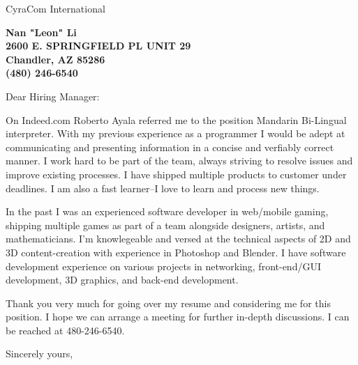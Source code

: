 \documentclass[10pt]{letter} %
\newcommand{\companyname}{CyraCom International}
\begin{document}
\signature{Nan "Leon" Li}                  %
\longindentation=5pt                       %
\let\raggedleft\raggedright                %
 
\begin{letter}{\companyname} 

\begin{center}
\large\bf Nan "Leon" Li \\
2600 E. SPRINGFIELD PL UNIT 29 \\ Chandler, AZ 85286 \\ (480) 246-6540%
\end{center} 

\opening{Dear Hiring Manager:} 

\noindent On Indeed.com Roberto Ayala referred me to the position Mandarin Bi-Lingual interpreter. With my previous experience as a programmer I would be adept at communicating and presenting information in a concise and verfiably correct manner. I work hard to be part of the team, always striving to resolve issues and improve existing processes. I have shipped multiple products to customer under deadlines. I am also a fast learner--I love to learn and process new things. 

\noindent In the past I was an experienced software developer in web/mobile gaming, shipping multiple games as part of a team alongside designers, artists, and mathematicians. I'm knowlegeable and versed at the technical aspects of 2D and 3D content-creation with experience in Photoshop and Blender. I have software development experience on various projects in networking, front-end/GUI development, 3D graphics, and back-end development. 

\noindent Thank you very much for going over my resume and considering me for this position. I hope we can arrange a meeting for further in-depth discussions. I can be reached at 480-246-6540.

\closing{Sincerely yours,}

\signature{}
 
\encl{}  				%

\end{letter}
 
\end{document}
